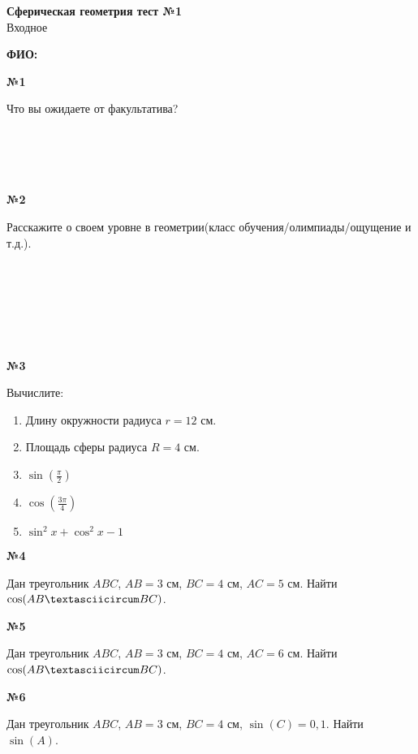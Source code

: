 


    \begin{center}
        \textbf{Сферическая геометрия тест №1}\\
        Входное
    \end{center}

    \textbf{ФИО:}

    \begin{center}
        \textbf{№1}
    \end{center}

    Что вы ожидаете от факультатива? \\ \ \\ \ \\ \ \\ \

    \begin{center}
        \textbf{№2}
    \end{center}

    Расскажите о своем уровне в геометрии(класс обучения/олимпиады/ощущение и т.д.).
    \\ \ \\ \ \\ \\ \ \\ \\ \ \\

    \begin{center}
        \textbf{№3}
    \end{center}

    Вычислите:
    \begin{enumerate}
        \item Длину окружности радиуса $r = 12$ см.
        \item Площадь сферы радиуса $R = 4$ см.
        \item $\sin\left(\frac{\pi}{2}\right)$
        \item $\cos\left(\frac{3\pi}{4}\right)$
        \item $\sin ^ 2 x + \cos ^ 2 x - 1$
    \end{enumerate}

    \begin{center}
        \textbf{№4}
    \end{center}

    Дан треугольник $ABC$, $AB = 3$ см, $BC = 4$ см, $AC = 5$ см.
    Найти $\cos(AB \textasciicircum BC)$.

    \begin{center}
        \textbf{№5}
    \end{center}

    Дан треугольник $ABC$, $AB = 3$ см, $BC = 4$ см, $AC = 6$ см.
    Найти $\cos(AB \textasciicircum BC)$.

    \begin{center}
        \textbf{№6}
    \end{center}

    Дан треугольник $ABC$, $AB = 3$ см, $BC = 4$ см, $\sin(C) = 0,1$.
    Найти $\sin(A)$.



